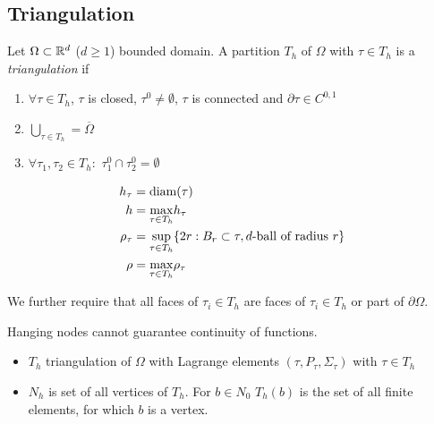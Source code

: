 
\subsection{Triangulation}


\begin{definition_}
	Let $\Omega \subset \mathbb{R}^d$ ($d \geq 1$) bounded domain. A partition $T_h$ of $\Omega$ with $\tau \in T_h$ is a \textit{triangulation} if
	\begin{enumerate}[label=\alph*)]
		\item $\forall \tau \in T_h$, $\tau$ is closed, $\tau^0 \neq \emptyset$, $\tau$ is connected and $\partial \tau \in C^{0,1}$
				
		\item $\bigcup \limits_{\tau \in T_h} = \overline{\Omega}$
		
		\item $\forall \tau_1,\tau_2 \in T_h:$ $\tau^0_1\cap \tau^0_2 = \emptyset$
	\end{enumerate}

	\begin{align*}
		h_{\tau} &= \text{diam} (\tau)\\
		h &= \underset{\tau \in T_h}{\max} h_{\tau}\\
		\rho_{\tau} &= \underset{\tau \in T_h}{\sup} \{2r: B_r \subset \tau, d\text{-ball of radius  }r \} \\
		\rho &= \underset{\tau \in T_h}{\max} \rho_{\tau}
	\end{align*}
\end{definition_}

We further require that all faces of $\tau_i \in T_h$ are faces of $\tau_i \in T_h$ or part of $\partial \Omega$.

Hanging nodes cannot guarantee continuity of functions.

\begin{itemize}
	\item $T_h$ triangulation of $\Omega$ with Lagrange elements $(\tau,P_\tau,\Sigma_\tau)$ with $\tau \in T_h$
	\item  $N_h$ is set of all vertices of $T_h$. For $b\in N_0 $ $T_h(b) $ is the set of all finite elements, for which $b$ is a vertex.
\end{itemize}

